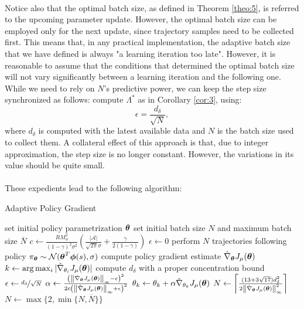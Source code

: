 \paragraph{}
Notice also that the optimal batch size, as defined in Theorem \ref{theo:5}, is referred to the upcoming parameter update. However, the optimal batch size can be employed only for the next update, since trajectory samples need to be collected first. This means that, in any practical implementation, the adaptive batch size that we have defined is always "a learning iteration too late". However, it is reasonable to assume that the conditions that determined the optimal batch size will not vary significantly between a learning iteration and the following one. While we need to rely on $N$'s predictive power, we can keep the step size synchronized as follows: compute $\Lambda^*$ as in Corollary \ref{cor:3}, using:
\[
	\epsilon = \frac{d_\delta}{\sqrt{N}},
\]
where $d_\delta$ is computed with the latest available data and $N$ is the batch size used to collect them. A collateral effect of this approach is that, due to integer approximation, the step size is no longer constant. However, the variations in its value should be quite small.
\paragraph{}
These expedients lead to the following algorithm: 
\begin{algorithm}[H]\label{alg:adabatch}
\caption{Adaptive Policy Gradient}\label{alg:general}
\begin{algorithmic}
\State set initial policy parametrization $\vtheta$
\State set initial batch size $N$ and maximum batch size $\overline{N}$
\State $c \gets 		\frac{RM_{\phi}^2}{(1-\gamma)^2\sigma^2}\left(\frac{|\mathcal{A}|}{\sqrt{2\pi}\sigma} +	\frac{\gamma}{2(1-\gamma)}\right)$
\State $\epsilon \gets 0$
\While{$\epsilon < |\gradApp{\vtheta}|$} 
\State perform $N$ trajectories following policy 
	$\pi_{\vtheta} \sim \mathcal{N}(\vtheta^T\vphi(s),\sigma)$
\State compute policy gradient estimate $\gradApp{\vtheta}$
\State $k \gets \arg\max_i|\gradApp{\theta_i}|$
\State compute $d_\delta$ with a proper concentration bound
\State $\epsilon \gets \nicefrac{d_\delta}{\sqrt{N}}$
\State $\alpha \gets \frac{
		\left(\norm[\infty]{\gradApp{\vtheta}} - \epsilon\right)^2}
		{2c
		\left(\norm[\infty]{\gradApp{\vtheta}} + \epsilon\right)^2}$
\State $\theta_k \gets \theta_k + \alpha\gradApp{\theta_k}$
\State $N \gets \left\lceil\frac{(13+3\sqrt{17})d_{\delta}^2}{2\norm[\infty]{\gradApp{\vtheta}}^2}\right\rceil$
\State $N \gets \max\{2,\min\{N,\overline{N}\}\}$
\EndWhile
\end{algorithmic}
\end{algorithm}

